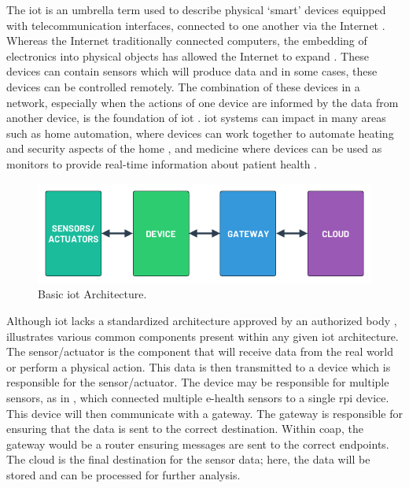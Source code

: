 The \acrfull{iot} is an umbrella term used to describe physical `smart' devices
equipped with telecommunication interfaces, connected to one another via the 
Internet \citep{centenaro_long-range_2016}.
Whereas the Internet traditionally connected computers, the embedding of 
electronics into physical objects has allowed the Internet to expand \citep{miorandi_internet_2012}.
These devices can contain sensors which will produce data and in some cases, 
these devices can be controlled remotely. The combination of these devices in
a network, especially when the actions of one device are informed by the 
data from another device, is the foundation of \gls{iot} \citep{minerva_towards_2015}.
\gls{iot} systems can impact in many areas such as home automation,
where devices can work together to automate heating and security aspects of 
the home \citep{lee_internet_2018}, and medicine where devices
can be used as monitors to provide real-time information about 
patient health \citep{kumar_iot_2016}.

\begin{figure}[H]
    \centering
    \includegraphics[width=\imageWidth\textwidth]{assets/generic_iot_architecture.png}
    \caption{\label{fig:generic_iot_architecture} Basic \gls{iot} Architecture.}
\end{figure}

Although \gls{iot} lacks a standardized architecture approved by an authorized
body \citep{minerva_towards_2015},
 illustrates various common
components present within any given \gls{iot} architecture.
The sensor/actuator is the component that will receive data from the real 
world or perform a physical action. 
This data is then transmitted to a device which is
responsible for the sensor/actuator.
The device may be responsible for multiple sensors,
as in \citet{jassas_smart_2015},
which connected multiple e-health sensors to a single \gls{rpi} device.
This device will then communicate with a gateway.
The gateway is responsible for ensuring that 
the data is sent to the correct destination. 
Within \gls{coap}, the gateway would be a router ensuring messages are sent 
to the correct endpoints. The cloud is the final destination for the sensor data; 
here, the data will be stored and can be processed for further analysis.
